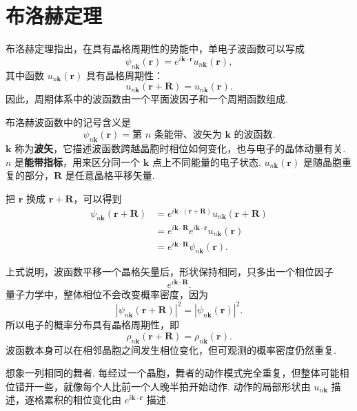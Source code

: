 \documentclass[UTF8,11pt,a4paper,openany]{ctexbook}
\newcommand{\term}[1]{\textbf{#1}}
\begin{document}
\section{布洛赫定理}

\begin{definitionbox}
布洛赫定理指出，在具有晶格周期性的势能中，单电子波函数可以写成
\[
\psi_{n\mathbf k}(\mathbf r)
=
e^{i\mathbf k\cdot\mathbf r}
u_{n\mathbf k}(\mathbf r),
\]
其中函数 $u_{n\mathbf k}(\mathbf r)$ 具有晶格周期性：
\[
u_{n\mathbf k}(\mathbf r+\mathbf R)
=
u_{n\mathbf k}(\mathbf r).
\]
因此，周期体系中的波函数由一个平面波因子和一个周期函数组成. 
\end{definitionbox}

\begin{notationbox}
布洛赫波函数中的记号含义是
\[
\psi_{n\mathbf k}(\mathbf r)
=
\text{第 $n$ 条能带、波矢为 $\mathbf k$ 的波函数}.
\]
$\mathbf k$ 称为\term{波矢}，它描述波函数跨越晶胞时相位如何变化，也与电子的晶体动量有关. $n$ 是\term{能带指标}，用来区分同一个 $\mathbf k$ 点上不同能量的电子状态. $u_{n\mathbf k}(\mathbf r)$ 是随晶胞重复的部分，$\mathbf R$ 是任意晶格平移矢量. 
\end{notationbox}

把 $\mathbf r$ 换成 $\mathbf r+\mathbf R$，可以得到
\[
\begin{aligned}
\psi_{n\mathbf k}(\mathbf r+\mathbf R)
&=
e^{i\mathbf k\cdot(\mathbf r+\mathbf R)}
u_{n\mathbf k}(\mathbf r+\mathbf R)\\
&=
e^{i\mathbf k\cdot\mathbf R}
e^{i\mathbf k\cdot\mathbf r}
u_{n\mathbf k}(\mathbf r)\\
&=
e^{i\mathbf k\cdot\mathbf R}
\psi_{n\mathbf k}(\mathbf r).
\end{aligned}
\]

\begin{derivationbox}
上式说明，波函数平移一个晶格矢量后，形状保持相同，只多出一个相位因子
\[
e^{i\mathbf k\cdot\mathbf R}.
\]
量子力学中，整体相位不会改变概率密度，因为
\[
\left|\psi_{n\mathbf k}(\mathbf r+\mathbf R)\right|^2
=
\left|\psi_{n\mathbf k}(\mathbf r)\right|^2.
\]
所以电子的概率分布具有晶格周期性，即
\[
\rho_{n\mathbf k}(\mathbf r+\mathbf R)
=
\rho_{n\mathbf k}(\mathbf r).
\]
波函数本身可以在相邻晶胞之间发生相位变化，但可观测的概率密度仍然重复. 
\end{derivationbox}

\begin{analogybox}
想象一列相同的舞者. 每经过一个晶胞，舞者的动作模式完全重复，但整体可能相位错开一些，就像每个人比前一个人晚半拍开始动作. 动作的局部形状由 $u_{n\mathbf k}$ 描述，逐格累积的相位变化由 $e^{i\mathbf k\cdot\mathbf r}$ 描述. 
\end{analogybox}
\end{document}
